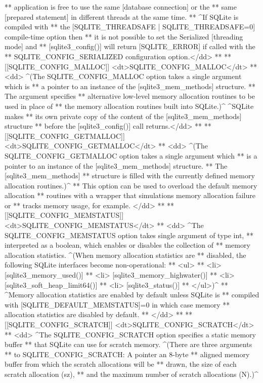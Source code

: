 \begin{Codex}[label=sqlite3.h,numbers=left]
{** application is free to use the same [database connection] or the
** same [prepared statement] in different threads at the same time.
** ^If SQLite is compiled with
** the [SQLITE_THREADSAFE | SQLITE_THREADSAFE=0] compile-time option then
** it is not possible to set the Serialized [threading mode] and
** [sqlite3_config()] will return [SQLITE_ERROR] if called with the
** SQLITE_CONFIG_SERIALIZED configuration option.</dd>
**
** [[SQLITE_CONFIG_MALLOC]] <dt>SQLITE_CONFIG_MALLOC</dt>
** <dd> ^(The SQLITE_CONFIG_MALLOC option takes a single argument which is 
** a pointer to an instance of the [sqlite3_mem_methods] structure.
** The argument specifies
** alternative low-level memory allocation routines to be used in place of
** the memory allocation routines built into SQLite.)^ ^SQLite makes
** its own private copy of the content of the [sqlite3_mem_methods] structure
** before the [sqlite3_config()] call returns.</dd>
**
** [[SQLITE_CONFIG_GETMALLOC]] <dt>SQLITE_CONFIG_GETMALLOC</dt>
** <dd> ^(The SQLITE_CONFIG_GETMALLOC option takes a single argument which
** is a pointer to an instance of the [sqlite3_mem_methods] structure.
** The [sqlite3_mem_methods]
** structure is filled with the currently defined memory allocation routines.)^
** This option can be used to overload the default memory allocation
** routines with a wrapper that simulations memory allocation failure or
** tracks memory usage, for example. </dd>
**
** [[SQLITE_CONFIG_MEMSTATUS]] <dt>SQLITE_CONFIG_MEMSTATUS</dt>
** <dd> ^The SQLITE_CONFIG_MEMSTATUS option takes single argument of type int,
** interpreted as a boolean, which enables or disables the collection of
** memory allocation statistics. ^(When memory allocation statistics are
** disabled, the following SQLite interfaces become non-operational:
**   <ul>
**   <li> [sqlite3_memory_used()]
**   <li> [sqlite3_memory_highwater()]
**   <li> [sqlite3_soft_heap_limit64()]
**   <li> [sqlite3_status()]
**   </ul>)^
** ^Memory allocation statistics are enabled by default unless SQLite is
** compiled with [SQLITE_DEFAULT_MEMSTATUS]=0 in which case memory
** allocation statistics are disabled by default.
** </dd>
**
** [[SQLITE_CONFIG_SCRATCH]] <dt>SQLITE_CONFIG_SCRATCH</dt>
** <dd> ^The SQLITE_CONFIG_SCRATCH option specifies a static memory buffer
** that SQLite can use for scratch memory.  ^(There are three arguments
** to SQLITE_CONFIG_SCRATCH:  A pointer an 8-byte
** aligned memory buffer from which the scratch allocations will be
** drawn, the size of each scratch allocation (sz),
** and the maximum number of scratch allocations (N).)^
}
\end{Codex}
